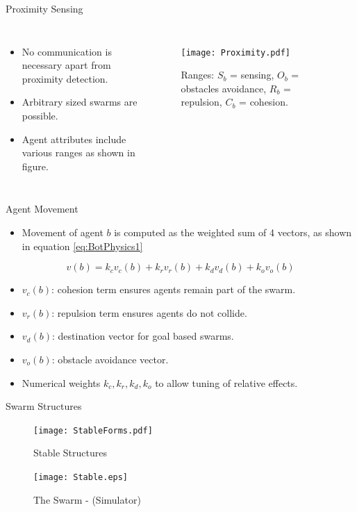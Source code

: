 \documentclass{beamer}
\begin{document}
\begin{frame}{Proximity Sensing}
  \begin{columns}
    \begin{itemize}
      \item {
        No communication is necessary apart from proximity detection.
      }
      \item {   
        Arbitrary sized swarms are possible.
      }
      \item {   
        Agent attributes include various ranges as shown in figure.
      }
    \end{itemize}
      \begin{figure}
        \begin{center}
        \texttt{[image: Proximity.pdf]}
        \end{center}
        \caption{Ranges: $S_b$ = sensing, $O_b$ = obstacles avoidance, $R_b$ = repulsion, $C_b$ = cohesion.}
      \end{figure}
  \end{columns} 
\end{frame}

\begin{frame}{Agent Movement}
  \begin{itemize}
    \item Movement of agent $b$ is computed as the weighted sum of 4 vectors, as shown in equation \ref{eq:BotPhysics1}
  \end{itemize}
  \begin{equation}\label{eq:BotPhysics1}
    v(b) = k_cv_c(b) + k_rv_r(b) + k_dv_d(b) + k_ov_o(b)
  \end{equation}
  \begin{itemize}
    \item $v_c(b)$: cohesion term ensures agents remain part of the swarm.
    \item $v_r(b)$: repulsion term ensures agents do not collide.
    \item $v_d(b)$: destination vector for goal based swarms.
    \item $v_o(b)$: obstacle avoidance vector.
    \item Numerical weights $k_c, k_r, k_d, k_o$ to allow tuning of relative effects. 
  \end{itemize}
  
\end{frame}

\begin{frame}{Swarm Structures}
  \begin{figure}
    \begin{center}
      \texttt{[image: StableForms.pdf]}
    \end{center}
    \caption{Stable Structures}
  \end{figure}
  \begin{figure}
    \begin{center}
      \texttt{[image: Stable.eps]}
    \end{center}
    \caption{The Swarm - (Simulator)}
  \end{figure}
\end{frame}
\end{document}
